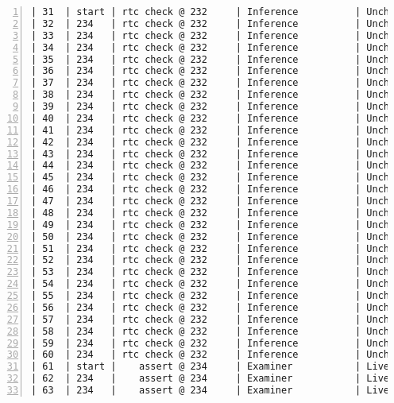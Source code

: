 \begin{lstlisting}[gobble=0, numbers=left, caption={POGS report for PCA Pump prototype}, label={listing:pca_ravenscar:pogs_full}]
| 31  | start | rtc check @ 232     | Inference          | Unchecked |   IU   |
| 32  | 234   | rtc check @ 232     | Inference          | Unchecked |   IU   |
| 33  | 234   | rtc check @ 232     | Inference          | Unchecked |   IU   |
| 34  | 234   | rtc check @ 232     | Inference          | Unchecked |   IU   |
| 35  | 234   | rtc check @ 232     | Inference          | Unchecked |   IU   |
| 36  | 234   | rtc check @ 232     | Inference          | Unchecked |   IU   |
| 37  | 234   | rtc check @ 232     | Inference          | Unchecked |   IU   |
| 38  | 234   | rtc check @ 232     | Inference          | Unchecked |   IU   |
| 39  | 234   | rtc check @ 232     | Inference          | Unchecked |   IU   |
| 40  | 234   | rtc check @ 232     | Inference          | Unchecked |   IU   |
| 41  | 234   | rtc check @ 232     | Inference          | Unchecked |   IU   |
| 42  | 234   | rtc check @ 232     | Inference          | Unchecked |   IU   |
| 43  | 234   | rtc check @ 232     | Inference          | Unchecked |   IU   |
| 44  | 234   | rtc check @ 232     | Inference          | Unchecked |   IU   |
| 45  | 234   | rtc check @ 232     | Inference          | Unchecked |   IU   |
| 46  | 234   | rtc check @ 232     | Inference          | Unchecked |   IU   |
| 47  | 234   | rtc check @ 232     | Inference          | Unchecked |   IU   |
| 48  | 234   | rtc check @ 232     | Inference          | Unchecked |   IU   |
| 49  | 234   | rtc check @ 232     | Inference          | Unchecked |   IU   |
| 50  | 234   | rtc check @ 232     | Inference          | Unchecked |   IU   |
| 51  | 234   | rtc check @ 232     | Inference          | Unchecked |   IU   |
| 52  | 234   | rtc check @ 232     | Inference          | Unchecked |   IU   |
| 53  | 234   | rtc check @ 232     | Inference          | Unchecked |   IU   |
| 54  | 234   | rtc check @ 232     | Inference          | Unchecked |   IU   |
| 55  | 234   | rtc check @ 232     | Inference          | Unchecked |   IU   |
| 56  | 234   | rtc check @ 232     | Inference          | Unchecked |   IU   |
| 57  | 234   | rtc check @ 232     | Inference          | Unchecked |   IU   |
| 58  | 234   | rtc check @ 232     | Inference          | Unchecked |   IU   |
| 59  | 234   | rtc check @ 232     | Inference          | Unchecked |   IU   |
| 60  | 234   | rtc check @ 232     | Inference          | Unchecked |   IU   |
| 61  | start |    assert @ 234     | Examiner           | Live      |   EL   |
| 62  | 234   |    assert @ 234     | Examiner           | Live      |   EL   |
| 63  | 234   |    assert @ 234     | Examiner           | Live      |   EL   |

\end{lstlisting}
